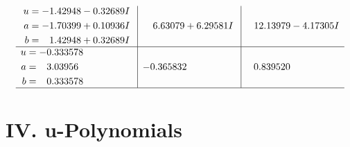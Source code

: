\documentclass[1p]{elsarticle_modified}
\theoremstyle{definition}
\begin{document}
$$\begin{array}{c|c|c}
\begin{aligned}
u &= -1.42948 - 0.32689 I \\
a &= -1.70399 + 0.10936 I \\
b &= \phantom{-}1.42948 + 0.32689 I\end{aligned}
 & \phantom{-}6.63079 + 6.29581 I & \phantom{-}12.13979 - 4.17305 I \\ \hline\begin{aligned}
u &= -0.333578\phantom{ +0.000000I} \\
a &= \phantom{-}3.03956\phantom{ +0.000000I} \\
b &= \phantom{-}0.333578\phantom{ +0.000000I}\end{aligned}
 & -0.365832\phantom{ +0.000000I} & \phantom{-}0.839520\phantom{ +0.000000I}\\
 \hline 
 \end{array}$$\newpage
\newpage\renewcommand{\arraystretch}{1}
\centering \section*{ IV. u-Polynomials}
\end{document}
